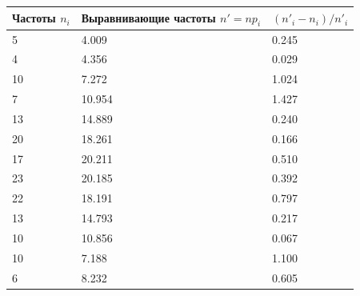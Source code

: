 \begin{table}[H]
    \begin{center}
        \begin{tabular}{|l|l|l|}
            \hline
            Частоты $n_{i}$ & Выравнивающие частоты $n{}' = np_{i}$ & $(n{}'_{i} - n_{i}) / n{}'_{i}$ \\
            \hline
            5               & 4.009                                 & 0.245                           \\
            \hline
            4               & 4.356                                 & 0.029                           \\
            \hline
            10              & 7.272                                 & 1.024                           \\
            \hline
            7               & 10.954                                & 1.427                           \\
            \hline
            13              & 14.889                                & 0.240                           \\
            \hline
            20              & 18.261                                & 0.166                           \\
            \hline
            17              & 20.211                                & 0.510                           \\
            \hline
            23              & 20.185                                & 0.392                           \\
            \hline
            22              & 18.191                                & 0.797                           \\
            \hline
            13              & 14.793                                & 0.217                           \\
            \hline
            10              & 10.856                                & 0.067                           \\
            \hline
            10              & 7.188                                 & 1.100                           \\
            \hline
            6               & 8.232                                 & 0.605                           \\
            \hline
        \end{tabular}
    \end{center}
\end{table}

